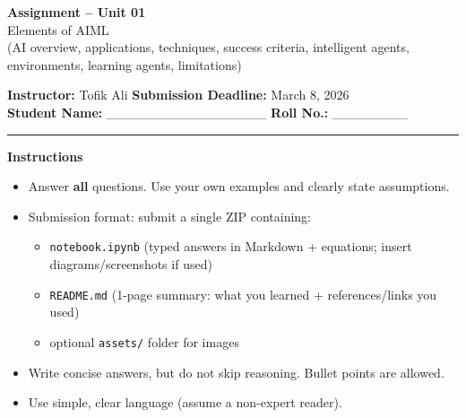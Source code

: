 \documentclass[11pt,a4paper]{article}
\newcommand{\SubmissionDeadline}{March 8, 2026}
\begin{document}
\begin{center}
  {\LARGE \textbf{Assignment -- Unit 01}}\\[0.25em]
  {\large Elements of AIML}\\[0.25em]
  \normalsize (AI overview, applications, techniques, success criteria, intelligent agents, environments, learning agents, limitations)
\end{center}

\noindent
\textbf{Instructor:} Tofik Ali \hfill \textbf{Submission Deadline:} \SubmissionDeadline\\
\textbf{Student Name:} \_\_\_\_\_\_\_\_\_\_\_\_\_\_\_\_\_ \hfill \textbf{Roll No.:} \_\_\_\_\_\_\_\_\\

\vspace{0.6em}
\hrule
\vspace{0.8em}

\textbf{Instructions}
\begin{itemize}[leftmargin=*]
  \item Answer \textbf{all} questions. Use your own examples and clearly state assumptions.
  \item Submission format: submit a single ZIP containing:
    \begin{itemize}[leftmargin=*]
      \item \texttt{notebook.ipynb} (typed answers in Markdown + equations; insert diagrams/screenshots if used)
      \item \texttt{README.md} (1-page summary: what you learned + references/links you used)
      \item optional \texttt{assets/} folder for images
    \end{itemize}
  \item Write concise answers, but do not skip reasoning. Bullet points are allowed.
  \item Use simple, clear language (assume a non-expert reader).
\end{itemize}

\vspace{0.6em}
\end{document}
